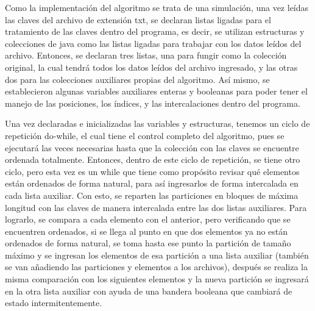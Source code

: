 \documentclass[11pt]{article}
\begin{document}
\par
Como la implementación del algoritmo se trata de una simulación, una vez leídas las claves del archivo de extensión txt, se declaran listas ligadas para el tratamiento de las claves dentro del programa, es decir, se utilizan estructuras y colecciones de java como las listas ligadas para trabajar con los datos leídos del archivo. Entonces, se declaran tres listas, una para fungir como la colección original, la cual tendrá todos los datos leídos del archivo ingresado, y las otras dos para las colecciones auxiliares propias del algoritmo. Así mismo, se establecieron algunas variables auxiliares enteras y booleanas para poder tener el manejo de las posiciones, los índices, y las intercalaciones dentro del programa. 
\par
Una vez declaradas e inicializadas las variables y estructuras, tenemos un ciclo de repetición do-while, el cual tiene el control completo del algoritmo, pues se ejecutará las veces necesarias hasta que la colección con las claves se encuentre ordenada totalmente. Entonces, dentro de este ciclo de repetición, se tiene otro ciclo, pero esta vez es un while que tiene como propósito revisar qué elementos están ordenados de forma natural, para así ingresarlos de forma intercalada en cada lista auxiliar. Con esto, se reparten las particiones en bloques de máxima longitud con las claves de manera intercalada entre las dos listas auxiliares. Para lograrlo, se compara a cada elemento con el anterior, pero verificando que se encuentren ordenados, si se llega al punto en que dos elementos ya no están ordenados de forma natural, se toma hasta ese punto la partición de tamaño máximo y se ingresan los elementos de esa partición a una lista auxiliar (también se van añadiendo las particiones y elementos a los archivos), después se realiza la misma comparación con los siguientes elementos y la nueva partición se ingresará en la otra lista auxiliar con ayuda de una bandera booleana que cambiará de estado intermitentemente.
\par
\end{document}
